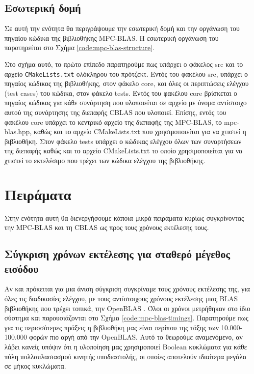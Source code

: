 \subsection{Εσωτερική δομή}

Σε αυτή την ενότητα θα περιγράψουμε την εσωτερική δομή και την οργάνωση του πηγαίου κώδικα της βιβλιοθήκης MPC-BLAS. Η εσωτερική οργάνωση του παρατηρείται στο Σχήμα \ref{code:mpc-blas-structure}.


Στο σχήμα αυτό, το πρώτο επίπεδο παρατηρούμε πως υπάρχει ο φάκελος src και το αρχείο \texttt{CMakeLists.txt} ολόκληρου του πρότζεκτ. Εντός του φακέλου src, υπάρχει ο πηγαίος κώδικας της βιβλιοθήκης, στον φάκελο core, και όλες οι περιπτώσεις ελέγχου (test cases) του κώδικα, στον φάκελο tests. Εντός του φακέλου core βρίσκεται ο πηγαίος κώδικας για κάθε συνάρτηση που υλοποιείται σε αρχείο με όνομα αντίστοιχο αυτού της συνάρτησης της διεπαφής CBLAS που υλοποιεί. Επίσης, εντός του φακέλου core υπάρχει το κεντρικό αρχείο της διεπαφής της MPC-BLAS, το mpc-blas.hpp, καθώς και το αρχείο CMakeLists.txt που χρησιμοποιείται για να χτιστεί η βιβλιοθήκη. Στον φάκελο tests υπάρχει ο κώδικας ελέγχου όλων των συναρτήσεων της διεπαφής καθώς και το αρχείο CMakeLists.txt το οποίο χρησιμοποιείται για να χτιστεί το εκτελέσιμο που τρέχει των κώδικα ελέγχου της βιβλιοθήκης.

\section{Πειράματα}

Στην ενότητα αυτή θα διενεργήσουμε κάποια μικρά πειράματα κυρίως συγκρίνοντας την ΜPC-BLAS και τη CBLAS ως προς τους χρόνους εκτέλεσης τους.

\subsection{Σύγκριση χρόνων εκτέλεσης για σταθερό μέγεθος εισόδου}

Αν και πρόκειται για μια άνιση σύγκριση συγκρίναμε τους χρόνους εκτέλεσης της, για όλες τις διαδικασίες ελέγχου, με τους αντίστοιχους χρόνους εκτέλεσης μιας BLAS βιβλιοθήκης που τρέχει τοπικά, την OpenBLAS \cite{xian2011openblas}. Όλοι οι χρόνοι μετρήθηκαν στο ίδιο σύστημα και παρουσιάζονται στο Σχήμα \ref{code:mpc-blas-timings}. Παρατηρούμε πως για τις περισσότερες πράξεις η βιβλιοθήκη μας είναι περίπου της τάξης των 10.000-100.000 φορών πιο αργή από την OpenBLAS. Αυτό το θεωρούμε αναμενόμενο, αν λάβει κανείς υπόψιν ότι η υλοποίηση μας χρησιμοποιεί Boolean κυκλώματα για κάθε πύλη πολλαπλασιασμού κινητής υποδιαστολής, οι οποίες αποτελούν ιδιαίτερα μεγάλα σε μήκος κυκλώματα.

